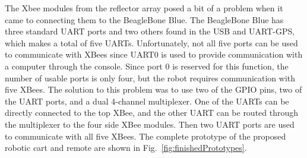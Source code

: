 \documentclass[conference]{IEEEtran}
\begin{document}
The Xbee modules from the reflector array posed a bit of a problem when it came to connecting them to the BeagleBone Blue. The BeagleBone Blue has three standard UART ports and two others found in the USB and UART-GPS, which makes a total of five UARTs. Unfortunately, not all five ports can be used to communicate with XBees since UART0 is used to provide communication with a computer through the console. Since port 0 is reserved for this function, the number of usable ports is only four, but the robot requires communication with five XBees. The solution to this problem was to use two of the GPIO pins, two of the UART ports, and a dual 4-channel multiplexer. One of the UARTs can be directly connected to the top XBee, and the other UART can be routed through the multiplexer to the four side XBee modules. Then two UART ports are used to communicate with all five XBees. %
The complete prototype of the proposed robotic cart and remote are shown in Fig.~\ref{fig:finishedPrototypes}. %
%
\end{document}
